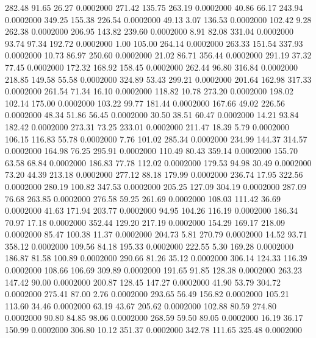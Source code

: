  282.48   91.65   26.27   0.0002000
 271.42  135.75  263.19   0.0002000
  40.86   66.17  243.94   0.0002000
 349.25  155.38  226.54   0.0002000
  49.13    3.07  136.53   0.0002000
 102.42    9.28  262.38   0.0002000
 206.95  143.82  239.60   0.0002000
   8.91   82.08  331.04   0.0002000
  93.74   97.34  192.72   0.0002000
   1.00  105.00  264.14   0.0002000
 263.33  151.54  337.93   0.0002000
  10.73   86.97  250.60   0.0002000
  21.02   86.71  356.44   0.0002000
 291.19   37.32   77.45   0.0002000
 172.32  168.92  158.45   0.0002000
 262.44   96.80  316.84   0.0002000
 218.85  149.58   55.58   0.0002000
 324.89   53.43  299.21   0.0002000
 201.64  162.98  317.33   0.0002000
 261.54   71.34   16.10   0.0002000
 118.82   10.78  273.20   0.0002000
 198.02  102.14  175.00   0.0002000
 103.22   99.77  181.44   0.0002000
 167.66   49.02  226.56   0.0002000
  48.34   51.86   56.45   0.0002000
  30.50   38.51   60.47   0.0002000
  14.21   93.84  182.42   0.0002000
 273.31   73.25  233.01   0.0002000
 211.47   18.39    5.79   0.0002000
 106.15  116.83   55.78   0.0002000
   7.76  101.02  285.34   0.0002000
 234.99  144.37  314.57   0.0002000
 164.98   76.25  295.91   0.0002000
 110.49   80.43  359.14   0.0002000
 155.70   63.58   68.84   0.0002000
 186.83   77.78  112.02   0.0002000
 179.53   94.98   30.49   0.0002000
  73.20   44.39  213.18   0.0002000
 277.12   88.18  179.99   0.0002000
 236.74   17.95  322.56   0.0002000
 280.19  100.82  347.53   0.0002000
 205.25  127.09  304.19   0.0002000
 287.09   76.68  263.85   0.0002000
 276.58   59.25  261.69   0.0002000
 108.03  111.42   36.69   0.0002000
  41.63  171.94  203.77   0.0002000
  94.95  104.26  116.19   0.0002000
 186.34   70.97   17.18   0.0002000
 352.44  129.20  217.19   0.0002000
 154.29  169.17  218.09   0.0002000
  85.47  100.38   11.37   0.0002000
 204.73    5.81  270.79   0.0002000
  14.52   93.71  358.12   0.0002000
 109.56   84.18  195.33   0.0002000
 222.55    5.30  169.28   0.0002000
 186.87   81.58  100.89   0.0002000
 290.66   81.26   35.12   0.0002000
 306.14  124.33  116.39   0.0002000
 108.66  106.69  309.89   0.0002000
 191.65   91.85  128.38   0.0002000
 263.23  147.42   90.00   0.0002000
 200.87  128.45  147.27   0.0002000
  41.90   53.79  304.72   0.0002000
 275.41   87.00    2.76   0.0002000
 293.65   56.49  156.82   0.0002000
 105.21  113.60   34.46   0.0002000
  63.19   43.67  205.62   0.0002000
 102.88   80.59  274.80   0.0002000
  90.80   84.85   98.06   0.0002000
 268.59   59.50   89.05   0.0002000
  16.19   36.17  150.99   0.0002000
 306.80   10.12  351.37   0.0002000
 342.78  111.65  325.48   0.0002000
